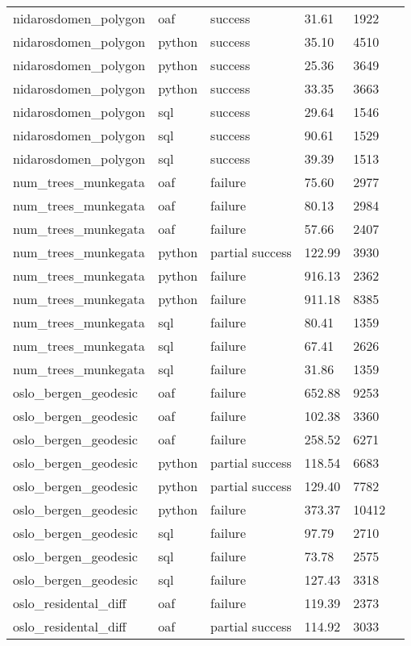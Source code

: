 \begin{longtable}{lp{1.8cm}p{1.8cm}p{1.8cm}p{1.8cm}p{1.8cm}}
nidarosdomen\_polygon & oaf & success & 31.61 & 1922 \\
nidarosdomen\_polygon & python & success & 35.10 & 4510 \\
nidarosdomen\_polygon & python & success & 25.36 & 3649 \\
nidarosdomen\_polygon & python & success & 33.35 & 3663 \\
nidarosdomen\_polygon & sql & success & 29.64 & 1546 \\
nidarosdomen\_polygon & sql & success & 90.61 & 1529 \\
nidarosdomen\_polygon & sql & success & 39.39 & 1513 \\
num\_trees\_munkegata & oaf & failure & 75.60 & 2977 \\
num\_trees\_munkegata & oaf & failure & 80.13 & 2984 \\
num\_trees\_munkegata & oaf & failure & 57.66 & 2407 \\
num\_trees\_munkegata & python & partial success & 122.99 & 3930 \\
num\_trees\_munkegata & python & failure & 916.13 & 2362 \\
num\_trees\_munkegata & python & failure & 911.18 & 8385 \\
num\_trees\_munkegata & sql & failure & 80.41 & 1359 \\
num\_trees\_munkegata & sql & failure & 67.41 & 2626 \\
num\_trees\_munkegata & sql & failure & 31.86 & 1359 \\
oslo\_bergen\_geodesic & oaf & failure & 652.88 & 9253 \\
oslo\_bergen\_geodesic & oaf & failure & 102.38 & 3360 \\
oslo\_bergen\_geodesic & oaf & failure & 258.52 & 6271 \\
oslo\_bergen\_geodesic & python & partial success & 118.54 & 6683 \\
oslo\_bergen\_geodesic & python & partial success & 129.40 & 7782 \\
oslo\_bergen\_geodesic & python & failure & 373.37 & 10412 \\
oslo\_bergen\_geodesic & sql & failure & 97.79 & 2710 \\
oslo\_bergen\_geodesic & sql & failure & 73.78 & 2575 \\
oslo\_bergen\_geodesic & sql & failure & 127.43 & 3318 \\
oslo\_residental\_diff & oaf & failure & 119.39 & 2373 \\
oslo\_residental\_diff & oaf & partial success & 114.92 & 3033 \\

\end{longtable}
